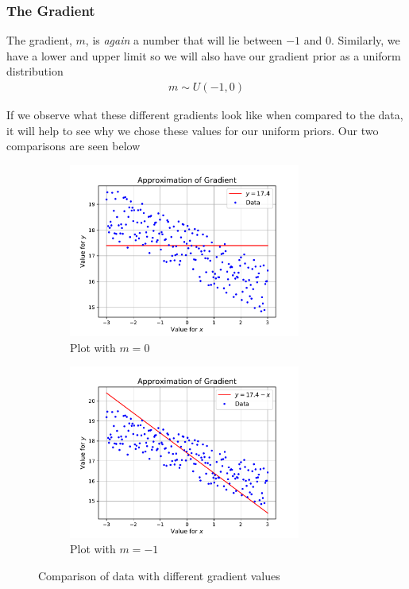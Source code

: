 \documentclass[12pt,twoside]{report}   %
\begin{document}
\subsubsection{The Gradient}\label{The Gradient}

The gradient, $m$, is \textit{again} a number that will lie between $-1$ and $0$. Similarly, we have a lower and upper limit so we will also have our gradient prior as a uniform distribution
\begin{align*}
m \sim U(-1, 0)
\end{align*}

If we observe what these different gradients look like when compared to the data, it will help to see why we chose these values for our uniform priors. Our two comparisons are seen below
\begin{figure}[H]
\centering
\begin{subfigure}{0.5\linewidth}
  \centering
  \includegraphics[width = 3in]{gradient0.pdf}
  \caption{Plot with $m = 0$}
  \label{fig:sub1}
\end{subfigure}%
\begin{subfigure}{0.5\linewidth}
  \centering
  \includegraphics[width = 3in]{gradient1.pdf}
  \caption{Plot with $m = -1$}
  \label{fig:sub2}
\end{subfigure}
\caption{Comparison of data with different gradient values}
\label{fig:gradient}
\end{figure}
\end{document}

